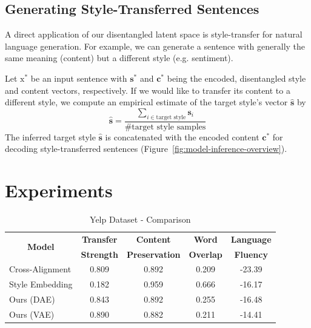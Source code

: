\documentclass[letterpaper]{article} %
\newcommand{\rmx}{\mathrm x}
\newcommand{\tabh}[1]{\multicolumn{1}{c|}{\textbf{#1}}}
\newcommand{\tabc}[2]{\multicolumn{1}{|c||}{\multirow{#1}{*}{\textbf{#2}}}}
\begin{document}
\subsection{Generating Style-Transferred Sentences} \label{ssec:sentence-generation}

A direct application of our disentangled latent space is style-transfer for natural language generation. For example, we can generate a sentence with generally the same meaning (content) but a different style (e.g. sentiment).

Let $\rmx^*$ be an input sentence with $\bm s^*$ and $\bm c^*$ being the encoded, disentangled style and content vectors, respectively. If we would like to transfer its content to a different style, we compute an empirical estimate of the target style's vector $\hat{\bm s}$ by
\begin{equation*}
	\hat{\bm s}=\frac{\sum_{i\in\text{target style}}\bm s_i}{\text{\# target style samples}}
\end{equation*}
The inferred target style $\hat{\bm s}$ is concatenated with the encoded content $\bm c^*$ for decoding style-transferred sentences (Figure~\ref{fig:model-inference-overview}).


\section{Experiments}

\begin{table}[ht]
	\centering
	\begin{tabular}{| l || c | c | c | c |}
		\hline
		\tabc{2}{Model}                      & \tabh{Transfer} & \tabh{Content}      & \tabh{Word}    & \tabh{Language} \\
		                                     & \tabh{Strength} & \tabh{Preservation} & \tabh{Overlap} & \tabh{Fluency}  \\
		\hline
		\hline
		Cross-Alignment \cite{shen2017style} & 0.809           & 0.892               & 0.209          & -23.39          \\
		\hline
		Style Embedding \cite{fu2017style}   & 0.182           & 0.959               & 0.666          & -16.17          \\
		\hline
		Ours (DAE)                           & 0.843           & 0.892               & 0.255          & -16.48          \\
		\hline
		Ours (VAE)                           & 0.890           & 0.882               & 0.211          & -14.41          \\
		\hline
	\end{tabular}
	\caption{Yelp Dataset - Comparison}
	\label{tab:yelp-comparison-previous}
\end{table}
\end{document}
